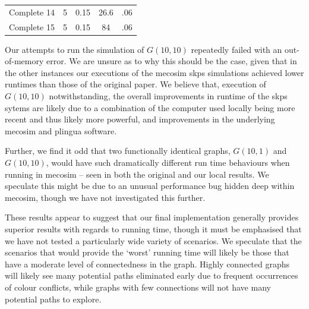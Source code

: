 \begin{table}
\begin{tabular}{@{}lcccc@{}}
Complete 14 & 5                                                            & 0.15                                                           & 26.6 & .06                                                       \\
Complete 15 & 5                                                            & 0.15                                                           & 84   & .06                                                       \\ \bottomrule
\end{tabular}%
\end{table}

Our attempts to run the simulation of \(G(10,10)\) repeatedly failed with an out-of-memory error.  We are unsure as to why this should be the case, given that in the other instances our executions of the \gls{mecosim} \gls{skps} simulations achieved lower runtimes than those of the original paper.  We believe that, execution of \(G(10,10)\) notwithstanding, the overall improvements in runtime of the \gls{skps} sytems are likely due to a combination of the computer used locally being more recent and thus likely more powerful, and improvements in the underlying \gls{mecosim} and \gls{plingua} software.

Further, we find it odd that two functionally identical graphs, \(G(10,1)\) and \(G(10,10)\), would have such dramatically different run time behaviours when running in \gls{mecosim} -- seen in both the original and our local results.  We speculate this might be due to an unusual performance bug hidden deep within \gls{mecosim}, though we have not investigated this further.

These results appear to suggest that our final implementation generally provides superior results with regards to running time, though it must be emphasised that we have not tested a particularly wide variety of scenarios.  We speculate that the scenarios that would provide the `worst' running time will likely be those that have a moderate level of connectedness in the graph.  Highly connected graphs will likely see many potential paths eliminated early due to frequent occurrences of colour conflicts, while graphs with few connections will not have many potential paths to explore.

